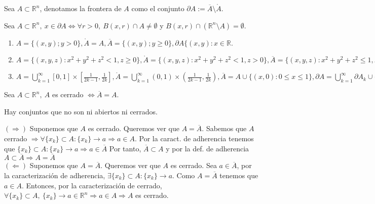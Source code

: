 \begin{defn}[Frontera]
Sea $A \subset \mathbb{R}^n$, denotamos la frontera de $A$ como el conjunto $\partial{A} := \overline{A}\setminus\mathring{A} $. 
\end{defn}

\begin{prop}
Sea $A \subset \mathbb{R}^n, \ x \in \partial{A} \Leftrightarrow \forall r > 0, \ B(x,r) \cap A \neq \emptyset$ y $B(x,r)\cap(\mathbb{R}^n\setminus A) = \emptyset$.
\end{prop}

\begin{ejm}
\begin{enumerate}[label=(\roman*)]
    \item $A = \{ (x,y); y> 0\}, \mathring{A} = A, \overline{A}= \{(x,y); y\geq 0\}, \partial A \{ (x,y): x\in\mathbb{R}$.
    \item $A = \{(x,y,z): x^2 + y^2 +z^2 < 1, z\geq 0 \}, \mathring{A} = \{(x,y,z): x^2 + y^2 +z^2 < 1, z> 0 \}, \overline{A} = \{(x,y,z): x^2 + y^2 +z^2 \leq 1, z\geq 0 \}, \partial A = \{(x,y,z): x^2 + y^2 +z^2 = 1, z = 0 \}$
    \item $ A = \bigcup_{k=1}^\infty [0,1]\times[\frac{1}{2k-1},\frac{1}{2k}], \mathring{A} =\bigcup_{k=1}^\infty (0,1)\times(\frac{1}{2k-1},\frac{1}{2k}), \overline{A} = A \cup \{ (x,0): 0\leq x \leq 1\}, \partial A = \bigcup_{k=1}^\infty \partial A_k \cup \{ (x,0): 0\leq x \leq 1\}$
\end{enumerate}
\end{ejm}

\begin{prop}
Sea $A \subset \mathbb{R}^n, \ A$ es cerrado $ \Leftrightarrow \overline{A} = A$.
\end{prop}

\begin{obs}
Hay conjuntos que no son ni abiertos ni cerrados.
\end{obs}

\begin{dem}
$(\Rightarrow)$ Suponemos que $A$ es cerrado. Queremos ver que $ A = \overline{A}$. Sabemos que $A$ cerrado $\Rightarrow \forall\{x_k\}\subset A: \{x_k\} \rightarrow a \Rightarrow a \in A$. Por la caract. de adherencia tenemos que $ \{x_k\}\subset A: \{x_k\} \rightarrow a \Rightarrow a\in \overline{A}$ Por tanto, $\overline{A} \subset A$ y por la def. de adherencia $A\subset \overline{A} \Rightarrow A = \overline{A}$\\

$(\Leftarrow)$ Suponemos que $ A = \overline{A}$. Queremos ver que $A$ es cerrado. Sea $a\in\overline{A}$, por la caracterización de adherencia, $\exists\{x_k\}\subset A: \{x_k\} \rightarrow a$. Como $ A = \overline{A}$ tenemos que $a\in A$. Entonces, por la caracterización de cerrado, $\forall \{x_k\} \subset A, \ \{x_k\} \rightarrow a \in \mathbb{R}^n \Rightarrow a \in A \Rightarrow A$ es cerrado.
\end{dem}


